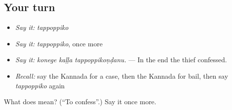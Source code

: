 \subsection*{Your turn}
\begin{itemize}
\raggedright
  \item \emph{Say it:} \emph{tappoppiko}
  \item \emph{Say it:} \emph{tappoppiko}, once more
  \item \emph{Say it:} \emph{konege kaḷḷa tappoppikoṇḍanu.} — In the end the thief confessed.
  \item \emph{Recall:} say the Kannada for a case, then the Kannada for bail, then say \emph{tappoppiko} again
\end{itemize}

\begin{tcolorbox}[breakable,colback=teal!4,colframe=teal!35!black,title={Before you move on}]
What does  mean? (\textquotedblleft{}To confess\textquotedblright{}.) Say it once more.
\end{tcolorbox}
